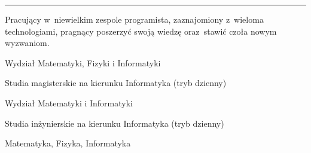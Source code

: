 \documentclass[11pt,a4paper]{article}
\begin{document}
    \noindent\rule{\textwidth}{0.4pt}
  
  
    \vspace{0.4cm}
  
    \smallskip
    \noindent
    Pracujący w~niewielkim zespole programista, zaznajomiony z~wieloma technologiami,\linebreak
    pragnący poszerzyć swoją wiedzę oraz~stawić czoła nowym wyzwaniom.
  
  
    \vspace{0.5cm}
  
    \medskip
    \vspace{-1.6mm}
    \begin{description} \itemsep0pt \parskip0pt 
        \item[ ] Wydział Matematyki, Fizyki i Informatyki
        \item[ ] Studia magisterskie na kierunku Informatyka (tryb dzienny)
    \end{description}
  
    \vspace{-1.6mm}
    \begin{description} \itemsep0pt \parskip0pt 
        \item[ ] Wydział Matematyki i Informatyki
        \item[ ] Studia inżynierskie na kierunku Informatyka (tryb dzienny)
    \end{description}
  
    \vspace{-1.6mm}
    \begin{description} \itemsep0pt \parskip0pt 
        \item[ ] Matematyka, Fizyka, Informatyka
    \end{description}
  
  
\end{document}

